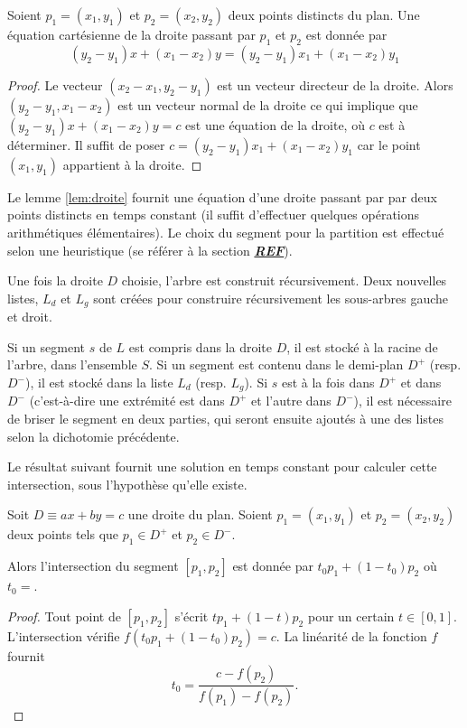 \begin{lem}\label{lem:droite}
  Soient $p_1 = (x_1, y_1)$ et $p_2 = (x_2, y_2)$ deux points distincts du
  plan. Une équation cartésienne de la droite  passant par $p_1$ et $p_2$
  est donnée par
  \begin{equation}
    \left(y_2 - y_1\right) x + \left(x_1 - x_2\right) y =
    \left(y_2 - y_1\right) x_1 + \left(x_1 - x_2\right) y_1
  \end{equation}
\end{lem}
\begin{proof}
  Le vecteur $(x_2 - x_1, y_2 - y_1)$ est un vecteur directeur de la droite.
  Alors $(y_2 - y_1, x_1 - x_2)$ est un vecteur normal de la droite ce qui
  implique que
  $\left(y_2 - y_1\right) x + \left(x_1 - x_2\right) y = c$ est une équation
  de la droite, où $c$ est à déterminer. Il suffit de poser
  $c = \left(y_2 - y_1\right) x_1 + \left(x_1 - x_2\right) y_1$
  car le point $(x_1, y_1)$ appartient à la droite.
\end{proof}

Le lemme \ref{lem:droite} fournit une équation d'une droite passant par
par deux points distincts en temps constant (il suffit d'effectuer
quelques opérations arithmétiques élémentaires). Le choix du segment
pour la partition est effectué selon une heuristique (se référer à la section
{\Huge \underline{\textsl{\textbf{REF}}}}).

Une fois la droite $D$ choisie, l'arbre est construit récursivement.
Deux nouvelles listes, $L_d$ et $L_g$ sont créées pour construire récursivement
les sous-arbres gauche et droit.

Si un segment $s$ de $L$ est compris dans la droite $D$, il est stocké à
la racine de l'arbre, dans l'ensemble $S$. Si un segment est contenu dans
le demi-plan $D^+$ (resp. $D^-$), il est stocké dans la liste $L_d$ (resp.
$L_g$). Si $s$ est à la fois dans $D^+$ et dans $D^-$ (c'est-à-dire une
extrémité est dans $D^+$ et l'autre dans $D^-$), il est nécessaire
de briser le segment en deux parties, qui seront ensuite ajoutés à une des
listes selon la dichotomie précédente.

Le résultat suivant fournit une solution en temps constant pour calculer
cette intersection, sous l'hypothèse qu'elle existe.

\begin{lem}
  Soit $D\equiv ax + by = c$ une droite du plan. Soient $p_1 = (x_1, y_1)$
  et $p_2 = (x_2, y_2)$ deux points tels que $p_1\in D^+$ et $p_2\in D^-$.

  Alors l'intersection du segment $[p_1, p_2]$ est donnée par $t_0p_1 + (1-t_0)p_2$
  où $t_0 = $.
\end{lem}
\begin{proof}
  Tout point de $[p_1, p_2]$ s'écrit $tp_1 + (1-t)p_2$ pour un certain
  $t\in [0, 1]$.
  L'intersection vérifie $f(t_0p_1 + (1-t_0)p_2) = c$. La linéarité de la
  fonction $f$ fournit $$t_0 = \frac{c-f(p_2)}{f(p_1)-f(p_2)}.$$
\end{proof}

